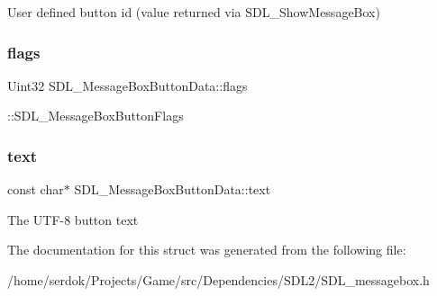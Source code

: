 User defined button id (value returned via S\+D\+L\+\_\+\+Show\+Message\+Box) \mbox{\label{structSDL__MessageBoxButtonData_a426c8b5da0e718242c7840706d95de0b}} 
\subsubsection{\texorpdfstring{flags}{flags}}
{\footnotesize\ttfamily Uint32 S\+D\+L\+\_\+\+Message\+Box\+Button\+Data\+::flags}

\+::\+S\+D\+L\+\_\+\+Message\+Box\+Button\+Flags \mbox{\label{structSDL__MessageBoxButtonData_af35f3062f0577159284c8828caaf08e4}} 
\subsubsection{\texorpdfstring{text}{text}}
{\footnotesize\ttfamily const char$\ast$ S\+D\+L\+\_\+\+Message\+Box\+Button\+Data\+::text}

The U\+T\+F-\/8 button text 

The documentation for this struct was generated from the following file\+:\begin{DoxyCompactItemize}
\item 
/home/serdok/\+Projects/\+Game/src/\+Dependencies/\+S\+D\+L2/S\+D\+L\+\_\+messagebox.\+h\end{DoxyCompactItemize}
